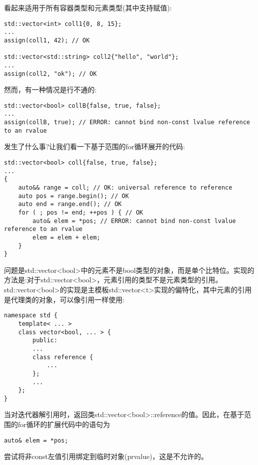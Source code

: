 看起来适用于所有容器类型和元素类型(其中支持赋值):\par

\begin{lstlisting}[caption={}]
std::vector<int> coll1{0, 8, 15};
...
assign(coll1, 42); // OK

std::vector<std::string> coll2{"hello", "world"};
...
assign(coll2, "ok"); // OK
\end{lstlisting}

然而，有一种情况是行不通的:\par

\begin{lstlisting}[caption={}]
std::vector<bool> collB{false, true, false};
...
assign(collB, true); // ERROR: cannot bind non-const lvalue reference to an rvalue
\end{lstlisting}

发生了什么事?让我们看一下基于范围的for循环展开的代码:\par

\begin{lstlisting}[caption={}]
std::vector<bool> coll{false, true, false};
...
{
	auto&& range = coll; // OK: universal reference to reference
	auto pos = range.begin(); // OK
	auto end = range.end(); // OK
	for ( ; pos != end; ++pos ) { // OK
		auto& elem = *pos; // ERROR: cannot bind non-const lvalue reference to an rvalue
		elem = elem + elem;
	}
}
\end{lstlisting}

问题是std::vector<bool>中的元素不是bool类型的对象，而是单个比特位。实现的方法是:对于std::vector<bool>，元素引用的类型不是元素类型的引用。std::vector<bool>的实现是主模板std::vector<t>实现的偏特化，其中元素的引用是代理类的对象，可以像引用一样使用:\par

\begin{lstlisting}[caption={}]
namespace std {
	template< ... >
	class vector<bool, ... > {
		public:
		...
		class reference {
			...
		};
		...
	};
}
\end{lstlisting}

当对迭代器解引用时，返回类std::vector<bool>::reference的值。因此，在基于范围的for循环的扩展代码中的语句为\par

\begin{lstlisting}[caption={}]
auto& elem = *pos;
\end{lstlisting}

尝试将非const左值引用绑定到临时对象(prvalue)，这是不允许的。\par

